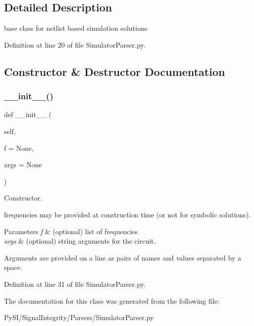 \subsection{Detailed Description}
base class for netlist based simulation solutions 

Definition at line 20 of file Simulator\+Parser.\+py.



\subsection{Constructor \& Destructor Documentation}
\mbox{\label{classSignalIntegrity_1_1Parsers_1_1SimulatorParser_1_1SimulatorParser_af9856388f7022892c3159ad55872a27e}} 
\subsubsection{\texorpdfstring{\+\_\+\+\_\+init\+\_\+\+\_\+()}{\_\_init\_\_()}}
{\footnotesize\ttfamily def \+\_\+\+\_\+init\+\_\+\+\_\+ (\begin{DoxyParamCaption}\item[{}]{self,  }\item[{}]{f = {\ttfamily None},  }\item[{}]{args = {\ttfamily None} }\end{DoxyParamCaption})}



Constructor. 

frequencies may be provided at construction time (or not for symbolic solutions).


\begin{DoxyParams}{Parameters}
{\em f} & (optional) list of frequencies \\
\hline
{\em args} & (optional) string arguments for the circuit.\\
\hline
\end{DoxyParams}
Arguments are provided on a line as pairs of names and values separated by a space. 

Definition at line 31 of file Simulator\+Parser.\+py.



The documentation for this class was generated from the following file\+:\begin{DoxyCompactItemize}
\item 
Py\+S\+I/\+Signal\+Integrity/\+Parsers/Simulator\+Parser.\+py\end{DoxyCompactItemize}
